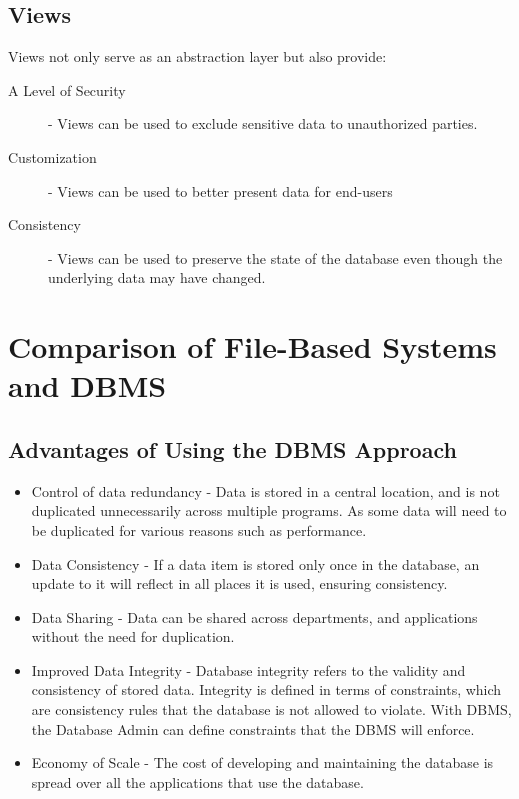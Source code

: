 \documentclass[12pt letter]{report}
\begin{document}

\subsection{Views}


Views not only serve as an abstraction layer but also provide:

\begin{description}
  \item[A Level of Security] - Views can be used to exclude sensitive data to unauthorized parties.
  \item[Customization] - Views can be used to better present data for end-users
  \item[Consistency] - Views can be used to preserve the state of the database even though the underlying data may have
        changed.
\end{description}

\section{Comparison of File-Based Systems and DBMS}

\subsection{Advantages of Using the DBMS Approach}

\begin{itemize}
  \item Control of data redundancy - Data is stored in a central location, and is not duplicated unnecessarily across multiple
        programs. As some data will need to be duplicated for various reasons such as performance.
  \item Data Consistency - If a data item is stored only once in the database, an update to it will reflect in all
        places it is used, ensuring consistency.
  \item Data Sharing - Data can be shared across departments, and applications without the need for duplication.
  \item Improved Data Integrity - Database integrity refers to the validity and consistency of stored data. Integrity is
        defined in terms of constraints, which are consistency rules that the database is not allowed to violate. With DBMS,
        the Database Admin can define constraints that the DBMS will enforce.
  \item Economy of Scale - The cost of developing and maintaining the database is spread over all the applications that
        use the database.
\end{itemize}
\end{document}
